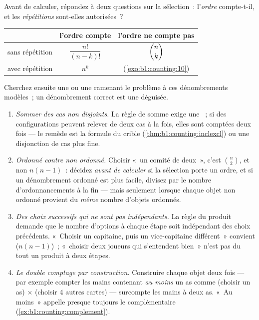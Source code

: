 \begin{method}\label{met:b1:counting:which}
Avant de calculer, répondez à deux questions sur la sélection~:
l'\emph{ordre} compte-t-il, et les \emph{répétitions} sont-elles
autorisées~?
\begin{center}
\renewcommand{\arraystretch}{1.4}
\begin{tabular}{l|c|c}
 & l'ordre compte & l'ordre ne compte pas \\
\hline
sans répétition & $\dfrac{n!}{(n-k)!}$ & $\dbinom{n}{k}$ \\[6pt]
avec répétition & $n^k$ & (\cref{exo:b1:counting:10}) \\
\end{tabular}
\end{center}
Cherchez ensuite une  ou une  ramenant le problème à
ces dénombrements modèles~; un dénombrement correct est une 
déguisée.
\end{method}

\begin{remark}\label{rem:b1:counting:pitfalls}
\begin{enumerate}
  \item \emph{Sommer des cas non disjoints.} La règle de somme exige une
        ~; si des configurations peuvent relever de deux cas à
        la fois, elles sont comptées deux fois --- le remède est la
        formule du crible (\cref{thm:b1:counting:inclexcl}) ou une
        disjonction de cas plus fine.
  \item \emph{Ordonné contre non ordonné.} Choisir «~un comité de
        deux~», c'est $\binom n2$, et non $n(n-1)$~: décidez \emph{avant
        de calculer} si la sélection porte un ordre, et si un
        dénombrement ordonné est plus facile, divisez par le nombre
        d'ordonnancements à la fin --- mais seulement lorsque chaque
        objet non ordonné provient du \emph{même} nombre d'objets
        ordonnés.
  \item \emph{Des choix successifs qui ne sont pas indépendants.}
        La règle du produit demande que le nombre d'options à chaque
        étape soit indépendant des choix précédents. «~Choisir un
        capitaine, puis un vice-capitaine différent~» convient ($n(n-1)$)~;
        «~choisir deux joueurs qui s'entendent bien~» n'est pas du tout
        un produit à deux étapes.
  \item \emph{Le double comptage par construction.} Construire chaque
        objet deux fois --- par exemple compter les mains contenant
        \emph{au moins} un as comme (choisir un as) $\times$ (choisir
        $4$ autres cartes) --- surcompte les mains à deux as. «~Au
        moins~» appelle presque toujours le complémentaire
        (\cref{ex:b1:counting:complement}).
\end{enumerate}
\end{remark}

